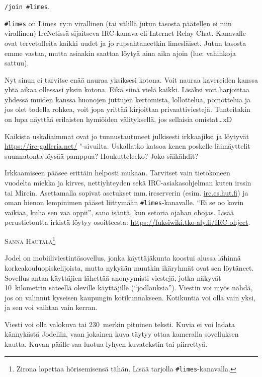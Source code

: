 \documentclass[a5paper, 8pt, twocolumn]{book} %
\numberwithin{equation}{section}
\begin{document}
\texttt{/join \#limes}.

\texttt{\#limes} on Limes~ry:n virallinen (tai välillä
jutun tasosta päätellen ei niin virallinen)
IrcNetissä sijaitseva IRC-kanava eli
Internet Relay Chat. Kanavalle ovat tervetulleita
kaikki uudet ja jo rupsahtaneetkin
limesläiset. Jutun tasosta emme vastaa,
mutta asiaakin saattaa löytyä aina aika
ajoin (lue: vahinkoja sattuu).

Nyt sinun ei tarvitse enää nauraa yksiksesi
kotona. Voit nauraa kavereiden kanssa
yhtä aikaa ollessasi yksin kotona. Eikä
siinä vielä kaikki. Lisäksi voit harjoittaa
yhdessä muiden kanssa huonojen juttujen
kertomista, lollottelua, pomottelua ja jos
olet todella rohkea, voit jopa yrittää kirjoittaa
privaattiviestejä. Tunteitakin on lupa
näyttää erilaisten hymiöiden välityksellä,
jos sellaisia omistat\dots xD

Kaikista uskaliaimmat ovat jo tunnustautuneet
julkisesti irkkaajiksi ja löytyvät
\url{https://irc-galleria.net/} "-sivuilta. Uskallatko
katsoa kenen poskelle läimäyttelit suunnatonta
löysää pamppua? Houkutteleeko?
Joko säikähdit?

Irkkaamiseen pääsee erittäin helposti
mukaan. Tarvitset vain tietokoneen vuodelta
miekka ja kirves, nettiyhteyden sekä IRC-asiakas\-ohjelman
kuten irssin tai Mircin. Asettamalla
sopivat asetukset mm.\,ircserverin (esim.
\url{irc.cs.hut.fi}) ja oman hienon lempinimen
pääset liittymään \texttt{\#limes}-kanavalle. ``Ei
se oo kovin vaikiaa, kuha sen vaa oppii'',
sano isäntä, kun setoria ojahan ohojas. Lisää
perustietoutta irkistä löytyy osoitteesta:
\url{https://fuksiwiki.tko-aly.fi/IRC-ohjeet}.

\vspace{0.5cm}\noindent\textsc{Sanna Hautala}\footnote{Zirona lopettaa hörisemisensä tähän. Lisää tarjolla \texttt{\#limes}-kanavalla.}

Jodel on mobiili\-viestintä\-sovellus, jonka käyttäjäkunta koostui alussa lähinnä korkea\-koulu\-opiskelijoista, mutta nykyään muutkin ikäryhmät ovat sen löytäneet. Sovellus antaa käyttäjien lähettää anonyymisti viestejä, jotka näkyvät 10~kilometrin säteellä oleville käyttäjille (``jodlauksia''). Viestin voi myös nähdä, jos on valinnut kyseisen kaupungin kotikunnakseen. Kotikuntia voi olla vain yksi, ja sen voi vaihtaa vain kerran.

Viesti voi olla valokuva tai 230~merkin pituinen teksti. Kuvia ei voi ladata kännykästä Jodeliin, vaan jokainen kuva täytyy ottaa kameralla sovelluksen kautta. Kuvan päälle saa luotua lyhyen kuvatekstin tai piirrettyä.
\end{document}
